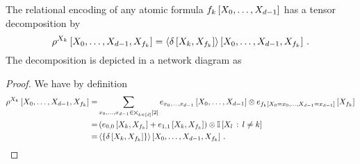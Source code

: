 \begin{theorem}\label{the:AtomicFTensor}
	The relational encoding of any atomic formula $f_{k}\left[X_{0},\ldots,X_{d-1}\right]$ has a tensor decomposition by
		\[ \rho^{X_{k}}\left[X_{0},\ldots,X_{d-1},X_{f_{k}}\right]
		= \left\langle \delta\left[X_{k},X_{f_{k}}\right]\right\rangle \left[ X_{0},\ldots,X_{d-1},X_{f_{k}} \right] \, . \]
	The decomposition is depicted in a network diagram as
	\begin{center}
		
	\end{center}
\end{theorem}
\begin{proof}
	We have by definition
	\begin{align*}
		\rho^{X_{k}}\left[X_{0},\ldots,X_{d-1},X_{f_{k}}\right]
		=& \sum_{x_{0},\ldots,x_{d-1}\in\bigtimes_{k\in[d]}[2]} e_{x_{0},\ldots,x_{d-1}}\left[X_{0},\ldots,X_{d-1}\right] \otimes e_{f_{k}\left[X_{0}=x_{0},\ldots,X_{d-1}=x_{d-1}\right]}\left[X_{f_{k}}\right] \\
		=& \left( e_{0,0}\left[X_{k},X_{f_{k}}\right] +
		e_{1,1}\left[X_{k},X_{f_{k}}\right] \right) \otimes \mathbb{I}\left[X_{l}\, : \, l \neq k\right] \\
		=& \left\langle \{\delta\left[X_{k},X_{f_{k}}\right]\}\right\rangle \left[ X_{0},\ldots,X_{d-1},X_{f_{k}} \right] \, .
	\end{align*} 
\end{proof}



